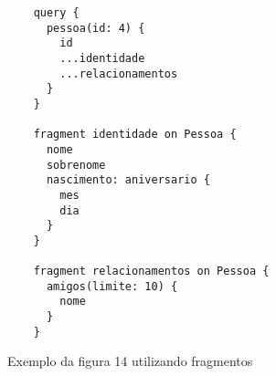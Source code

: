 \begin{figure}[H]
  \centering
  \begin{verbatim}
    query {
      pessoa(id: 4) {
        id
        ...identidade
        ...relacionamentos
      }
    }

    fragment identidade on Pessoa {
      nome
      sobrenome
      nascimento: aniversario {
        mes
        dia
      }
    }
    
    fragment relacionamentos on Pessoa {
      amigos(limite: 10) {
        nome
      }
    }
  \end{verbatim}
  \caption{Exemplo da figura 14 utilizando fragmentos}
\end{figure}
